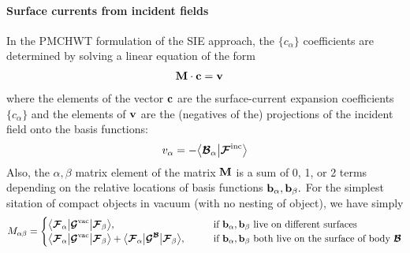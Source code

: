 \paragraph{Surface currents from incident fields}

In the PMCHWT formulation of the SIE approach, the $\{c_\alpha\}$
coefficients are determined by solving a linear equation of the form
\begin{align*}
 \mathbf{M} \cdot \mathbf{c} &= \mathbf{v}
\end{align*}
where the elements of the vector $\mathbf{c}$ are the surface-current 
expansion coefficients $\{c_\alpha\}$ and the elements of $\mathbf{v}$
are the (negatives of the) projections of the incident field
onto the basis functions:
$$ v_\alpha = -\big\langle \boldsymbol{\mathcal{B}}_\alpha \big| \boldsymbol{\mathcal{F}}^{\hbox{\scriptsize{inc}}} \big\rangle$$
Also, the $\alpha,\beta$ matrix element of the matrix $\mathbf{M}$ 
is a sum of 0, 1, or 2 terms depending on the relative locations
of basis functions $\mathbf{b}_\alpha, \mathbf{b}_\beta.$
For the simplest sitation of compact objects in vacuum (with no
nesting of object), we have simply
$$ M_{\alpha\beta} = \begin{cases}
   \big\langle \boldsymbol{\mathcal{F}}_\alpha \big| \boldsymbol{\mathcal{G}}^{\hbox{\scriptsize{vac}}} \big| \boldsymbol{\mathcal{F}}_\beta \big\rangle, 
   \qquad &\text{if } \mathbf{b}_\alpha, \mathbf{b}_\beta
   \text{ live on different surfaces}
 \\
   \big\langle \boldsymbol{\mathcal{F}}_\alpha \big| \boldsymbol{\mathcal{G}}^{\hbox{\scriptsize{vac}}} \big| \boldsymbol{\mathcal{F}}_\beta \big\rangle
   +
   \big\langle \boldsymbol{\mathcal{F}}_\alpha \big| \boldsymbol{\mathcal{G}}^{\boldsymbol{\mathcal{B}}} \big| \boldsymbol{\mathcal{F}}_\beta \big\rangle, 
   \qquad &\text{if } \mathbf{b}_\alpha, \mathbf{b}_\beta
   \text{ both live on the surface of body $\boldsymbol{\mathcal{B}}$}
  \end{cases}
$$

